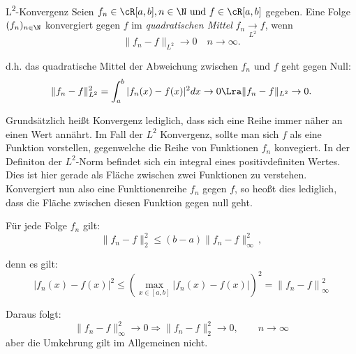 \begin{definition}{L\textsuperscript{2}-Konvergenz}
    Seien $f_n \in \cR[a,b], n \in \N \text{ und } f\in \cR[a,b]$ gegeben.
    Eine Folge $(f_n)_{n\in\N}$ konvergiert gegen $f$ im \emph{quadratischen Mittel}
    $f_n \underset{{L^2}}{\to} f$, wenn
    $$
        \|f_n - f\|_{L^2} \longrightarrow 0 \quad n \to \infty.
    $$

    d.h. das quadratische Mittel der Abweichung zwischen $f_n$ und $f$ geht gegen Null:
    $$
        \|f_n - f\|_{L^2}^2 = \int_a^b |f_n(x) - f(x)|^2dx \to 0  \Lra \|f_n - f\|_{L^2} \to 0.
    $$
\end{definition}
Grundsätzlich heißt Konvergenz lediglich, dass sich eine Reihe immer näher an einen Wert annährt. 
Im Fall der $L^2$ Konvergenz, sollte man sich $f$ als eine Funktion vorstellen, gegenwelche die Reihe von Funktionen $f_n$ konvegiert. In der Definiton der $L^2$-Norm befindet sich ein integral eines positivdefiniten Wertes. Dies ist hier gerade als Fläche zwischen zwei Funktionen zu verstehen. 
Konvergiert nun also eine Funktionenreihe $f_n$ gegen $f$, so heoßt dies lediglich, dass die Fläche zwischen diesen Funktion gegen null geht. 

\begin{bemerkungbox}
    Für jede Folge $f_n$ gilt:
    $$
        \|f_n - f\|_2^2 \le (b-a)\|f_n - f\|_\infty^2 \, ,
    $$

    denn es gilt:
    $$
        \left|f_n(x) - f(x)\right|^2 \leq \left(\max_{x \in [a,b]} \left|f_n(x) - f(x)\right|\right)^2 = \left\|f_n - f\right\|_\infty^2
    $$

    Daraus folgt:
    $$
        \|f_n - f\|_\infty^2 \to 0 \Rightarrow \|f_n - f\|_2^2 \to 0, \qquad n \to \infty
    $$
    aber die Umkehrung gilt im Allgemeinen nicht.   
\end{bemerkungbox}


